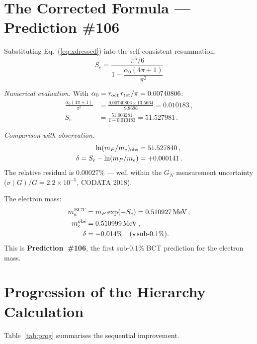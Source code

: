 \documentclass[10pt,twocolumn]{article}
\begin{document}
\section{The Corrected Formula --- Prediction \#106}

Substituting Eq.~(\ref{eq:xdressed}) into the self-consistent resummation:
\begin{equation}
\boxed{S_e = \frac{\pi^5/6}{1 - \dfrac{\alpha_0(4\pi+1)}{\pi^2}}}
\label{eq:Secorrected}
\end{equation}

\textit{Numerical evaluation.} With $\alpha_0 = r_{\rm oct}\,r_{\rm tet}/\pi = 0.00740806$:
\begin{align}
\frac{\alpha_0(4\pi+1)}{\pi^2}
  &= \frac{0.00740806\times 13.5664}{9.8696}
   = 0.010183\,, \label{eq:num1}\\
S_e &= \frac{51.003281}{1 - 0.010183}
     = 51.527981\,. \label{eq:num2}
\end{align}

\textit{Comparison with observation.}
\begin{align}
\ln(m_P/m_e)_{\rm obs} &= 51.527840\,, \notag\\
\delta = S_e - \ln(m_P/m_e) &= +0.000141\,.
\label{eq:residual}
\end{align}
The relative residual is $0.00027\%$ --- well within the $G_N$ measurement uncertainty
($\sigma(G)/G = 2.2\times10^{-5}$, CODATA 2018).

The electron mass:
\begin{align}
m_e^{\rm BCT} &= m_P\exp(-S_e) = 0.510927\,\text{MeV}\,, \label{eq:meBCT}\\
m_e^{\rm obs} &= 0.510999\,\text{MeV}\,, \label{eq:meobs}\\
\delta &= -0.014\%\quad(\star\,\text{sub-0.1\%}). \label{eq:meerr}
\end{align}
This is \textbf{Prediction~\#106}, the first sub-0.1\% BCT prediction for the electron mass.

\section{Progression of the Hierarchy Calculation}

Table~\ref{tab:prog} summarises the sequential improvement.
\end{document}
